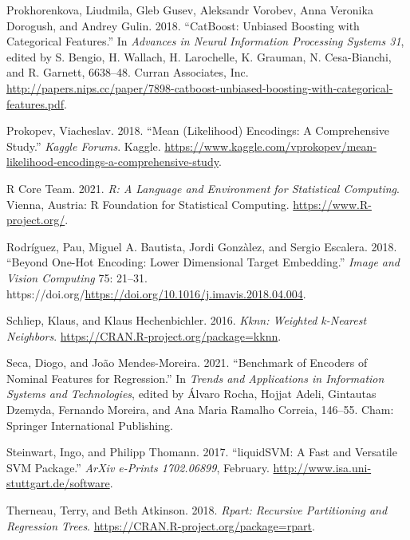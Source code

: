 \documentclass[smallextended]{svjour3}       %
\newlength{\cslhangindent}
\newlength{\cslentryspacingunit} %
\newenvironment{CSLReferences}[2] %
 {%
  \setlength{\parindent}{0pt}
  \ifodd #1
  \let\oldpar\par
  \def\par{\hangindent=\cslhangindent\oldpar}
  \fi
  \setlength{\parskip}{#2\cslentryspacingunit}
 }%
 {}
\begin{document}
\begin{CSLReferences}{1}{0}
\leavevmode{}%
Prokhorenkova, Liudmila, Gleb Gusev, Aleksandr Vorobev, Anna Veronika Dorogush, and Andrey Gulin. 2018. {``CatBoost: Unbiased Boosting with Categorical Features.''} In \emph{Advances in Neural Information Processing Systems 31}, edited by S. Bengio, H. Wallach, H. Larochelle, K. Grauman, N. Cesa-Bianchi, and R. Garnett, 6638--48. Curran Associates, Inc. \url{http://papers.nips.cc/paper/7898-catboost-unbiased-boosting-with-categorical-features.pdf}.

\leavevmode{}%
Prokopev, Viacheslav. 2018. {``Mean (Likelihood) Encodings: A Comprehensive Study.''} \emph{Kaggle Forums}. Kaggle. \url{https://www.kaggle.com/vprokopev/mean-likelihood-encodings-a-comprehensive-study}.

\leavevmode{}%
R Core Team. 2021. \emph{R: A Language and Environment for Statistical Computing}. Vienna, Austria: R Foundation for Statistical Computing. \url{https://www.R-project.org/}.

\leavevmode{}%
Rodríguez, Pau, Miguel A. Bautista, Jordi Gonzàlez, and Sergio Escalera. 2018. {``Beyond One-Hot Encoding: Lower Dimensional Target Embedding.''} \emph{Image and Vision Computing} 75: 21--31. https://doi.org/\url{https://doi.org/10.1016/j.imavis.2018.04.004}.

\leavevmode{}%
Schliep, Klaus, and Klaus Hechenbichler. 2016. \emph{Kknn: Weighted k-Nearest Neighbors}. \url{https://CRAN.R-project.org/package=kknn}.

\leavevmode{}%
Seca, Diogo, and João Mendes-Moreira. 2021. {``Benchmark of Encoders of Nominal Features for Regression.''} In \emph{Trends and Applications in Information Systems and Technologies}, edited by Álvaro Rocha, Hojjat Adeli, Gintautas Dzemyda, Fernando Moreira, and Ana Maria Ramalho Correia, 146--55. Cham: Springer International Publishing.

\leavevmode{}%
Steinwart, Ingo, and Philipp Thomann. 2017. {``{liquidSVM}: A Fast and Versatile SVM Package.''} \emph{{ArXiv e-Prints 1702.06899}}, February. \url{http://www.isa.uni-stuttgart.de/software}.

\leavevmode{}%
Therneau, Terry, and Beth Atkinson. 2018. \emph{Rpart: Recursive Partitioning and Regression Trees}. \url{https://CRAN.R-project.org/package=rpart}.


\end{CSLReferences}
\end{document}
